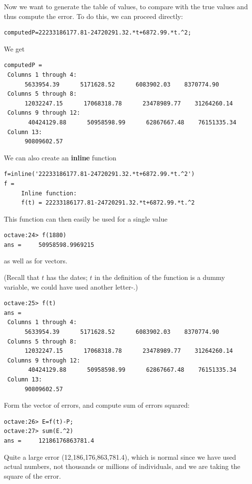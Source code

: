 Now we want to generate the table of values, to compare with the true values and thus compute the error. To do this, we can proceed directly:
\begin{verbatim}
computedP=22233186177.81-24720291.32.*t+6872.99.*t.^2;
\end{verbatim}
We get
\begin{verbatim}
computedP =
 Columns 1 through 4:
      5633954.39      5171628.52      6083902.03    8370774.90
 Columns 5 through 8:
      12032247.15      17068318.78      23478989.77    31264260.14
 Columns 9 through 12:
       40424129.88      50958598.99      62867667.48    76151335.34
 Column 13:
      90809602.57
\end{verbatim}

We can also create an \textbf{inline} function
\begin{verbatim}
f=inline('22233186177.81-24720291.32.*t+6872.99.*t.^2')
f =
     Inline function:
     f(t) = 22233186177.81-24720291.32.*t+6872.99.*t.^2
\end{verbatim}
This function can then easily be used for a single value
\begin{verbatim}
octave:24> f(1880)
ans =     50958598.9969215
\end{verbatim}
as well as for vectors.

(Recall that $t$ has the dates; $t$ in the definition of the function is a dummy
variable, we could have used another letter-.)
\begin{verbatim}
octave:25> f(t)
ans =
 Columns 1 through 4:
      5633954.39      5171628.52      6083902.03    8370774.90
 Columns 5 through 8:
      12032247.15      17068318.78      23478989.77    31264260.14
 Columns 9 through 12:
       40424129.88      50958598.99      62867667.48    76151335.34
 Column 13:
      90809602.57
\end{verbatim}
Form the vector of errors, and compute sum of errors squared:
\begin{verbatim}
octave:26> E=f(t)-P;
octave:27> sum(E.^2)
ans =     12186176863781.4
\end{verbatim}
Quite a large error (12,186,176,863,781.4), which is normal since we have used actual numbers, not thousands or millions of individuals, and we are taking the square of the error.

